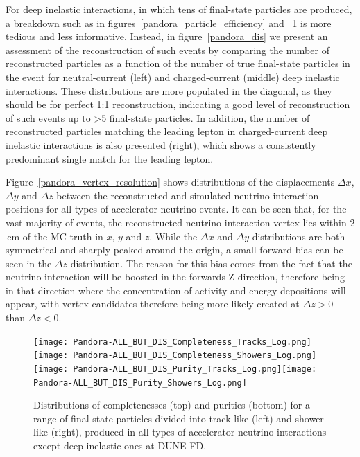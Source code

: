 For deep inelastic interactions, in which tens of final-state particles are produced, a breakdown such as in figures~\ref{pandora_particle_efficiency} and ~\ref{pandora_completeness_purity} is more tedious and less informative. Instead, in figure~\ref{pandora_dis} we present an assessment of the reconstruction of such events by comparing the number of reconstructed particles as a function of the number of true final-state particles in the event for neutral-current (left) and charged-current (middle) deep inelastic interactions. These distributions are more populated in the diagonal, as they should be for perfect 1:1 reconstruction, indicating a good level of reconstruction of such events up to >5 final-state particles. In addition, the number of reconstructed particles matching the leading lepton in charged-current deep inelastic interactions is also presented (right), which shows a consistently predominant single match for the leading lepton. 

Figure~\ref{pandora_vertex_resolution} shows distributions of the displacements $\Delta x$, $\Delta y$ and $\Delta z$ between the reconstructed and simulated neutrino interaction positions for all types of accelerator neutrino events. It can be seen that, for the vast majority of events, the reconstructed neutrino  interaction vertex lies within $2$\,cm of the MC truth in $x$, $y$ and $z$. While the $\Delta x$ and $\Delta y$ distributions are both symmetrical and sharply peaked around the origin, a small forward bias can be seen in the $\Delta z$ distribution. The reason for this bias comes from the fact that the neutrino interaction will be boosted in the forwards Z direction, therefore being in that direction where the concentration of activity and energy depositions will appear, with vertex candidates therefore being more likely created at $\Delta z>0$ than $\Delta z<0$.  

\begin{figure}[!ht]
\centering
\texttt{[image: Pandora-ALL\_BUT\_DIS\_Completeness\_Tracks\_Log.png]}\texttt{[image: Pandora-ALL\_BUT\_DIS\_Completeness\_Showers\_Log.png]}
\texttt{[image: Pandora-ALL\_BUT\_DIS\_Purity\_Tracks\_Log.png]}\texttt{[image: Pandora-ALL\_BUT\_DIS\_Purity\_Showers\_Log.png]}
\caption{Distributions of completenesses (top) and purities (bottom) for a range of final-state particles divided into track-like (left) and shower-like (right), produced in all types of accelerator neutrino interactions except deep inelastic ones at DUNE FD. }
\label{pandora_completeness_purity}
\end{figure}

